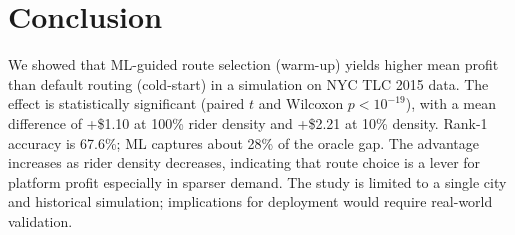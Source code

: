 \documentclass[11pt,a4paper]{article}
\begin{document}
\section{Conclusion}
\label{sec:conclusion}

We showed that ML-guided route selection (warm-up) yields higher mean profit than default routing (cold-start) in a simulation on NYC TLC 2015 data. The effect is statistically significant (paired $t$ and Wilcoxon $p < 10^{-19}$), with a mean difference of +\$1.10 at 100\% rider density and +\$2.21 at 10\% density. Rank-1 accuracy is 67.6\%; ML captures about 28\% of the oracle gap. The advantage increases as rider density decreases, indicating that route choice is a lever for platform profit especially in sparser demand. The study is limited to a single city and historical simulation; implications for deployment would require real-world validation.
\end{document}
